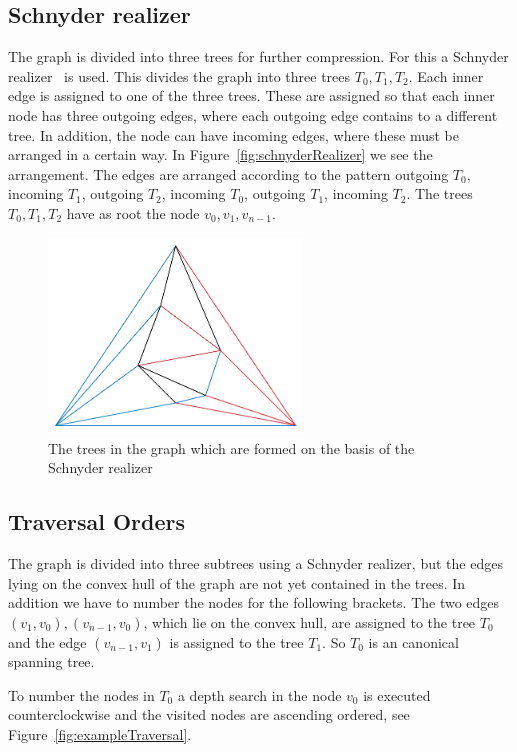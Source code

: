 \documentclass[a4paper]{scrartcl}
\begin{document}
\subsection{Schnyder realizer}
The graph is divided into three trees for further compression. For this a Schnyder realizer~\cite{schnyder} is used. This divides the graph into three trees $T_0,T_1,T_2$. Each inner edge is assigned to one of the three trees. These are assigned so that each inner node has three outgoing edges, where each outgoing edge contains to a different tree. In addition, the node can have incoming edges, where these must be arranged in a certain way. In Figure~\ref{fig:schnyderRealizer} we see the arrangement. The edges are arranged according to the pattern outgoing $T_0$, incoming $T_1$, outgoing $T_2$, incoming $T_0$, outgoing $T_1$, incoming $T_2$. The trees $T_0,T_1,T_2$ have as root the node $v_0,v_1,v_{n-1}$.


\begin{figure}[h]
	\centering
	\includegraphics[width=0.6\textwidth]{img/exampleSchnyder}
	\caption{The trees in the graph which are formed on the basis of the Schnyder realizer}
	\label{fig:exampleSchnyder}
\end{figure}


\subsection{Traversal Orders}
The graph is divided into three subtrees using a Schnyder realizer, but the edges lying on the convex hull of the graph are not yet contained in the trees. In addition we have to number the nodes for the following brackets.
The two edges $(v_1,v_0),(v_{n-1},v_0)$, which lie on the convex hull, are assigned to the tree $T_0$ and the edge $(v_{n-1},v_1)$ is assigned to the tree $T_1$. So $T_0$ is an canonical spanning tree.

To number the nodes in $T_0$ a depth search in the node $v_0$ is executed counterclockwise and the visited nodes are ascending ordered, see Figure~\ref{fig:exampleTraversal}.
\end{document}
